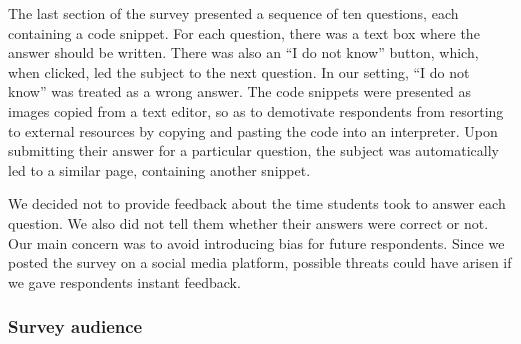 The last section of the survey presented a sequence of ten questions, each containing a code snippet. For each question, there was a text box where the answer should be written. There was also an ``I do not know'' button, which, when clicked, led the subject to the next question. In our setting, ``I do not know'' was treated as a wrong answer. The code snippets were presented as images copied from a text editor, so as to demotivate respondents from resorting to external resources by copying and pasting the code into an interpreter. Upon submitting their answer for a particular question, the subject was automatically led to a similar page, containing another snippet.

We decided not to provide feedback about the time students took to answer each question. We also did not tell them whether their answers were correct or not. Our main concern was to avoid introducing bias for future respondents. Since we posted the survey on a social media platform, possible threats could have arisen if we gave respondents instant feedback.



\subsubsection*{Survey audience}


